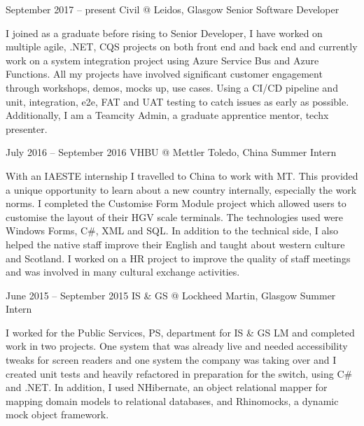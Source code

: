 \documentclass{tccv}
\begin{document}
\begin{eventlist}


\item{September 2017 -- present}
     {Civil @ Leidos, Glasgow}
     {Senior Software Developer}

I joined as a graduate before rising to Senior Developer, I have worked on multiple agile, .NET, CQS projects on both front end and back end and currently work on a system integration project using Azure Service Bus and Azure Functions. All my projects have involved significant customer engagement through workshops, demos, mocks up, use cases. Using a CI/CD pipeline and unit, integration, e2e, FAT and UAT testing to catch issues as early as possible. Additionally, I am a Teamcity Admin, a graduate apprentice mentor, techx presenter. 


\item{July 2016 -- September 2016}
     {VHBU @ Mettler Toledo, China}
     {Summer Intern}

With an IAESTE internship I travelled to China to work with MT. This provided a unique opportunity to learn about a new country internally, especially the work norms. I completed the Customise Form Module project which allowed users to customise the layout of their HGV scale terminals. The technologies used were Windows Forms, C\#, XML and SQL. In addition to the technical side, I also helped the native staff improve their English and taught about western culture and Scotland. I worked on a HR project to improve the quality of staff meetings and was involved in many cultural exchange activities.

\item{June 2015 -- September 2015}
     {IS \& GS @ Lockheed Martin, Glasgow}
     {Summer Intern}

I worked for the Public Services, PS, department for IS \& GS LM and completed work in two projects. One system that was already live and needed accessibility tweaks for screen readers and one system the company was taking over and I created unit tests and heavily refactored in preparation for the switch, using C\# and .NET. In addition, I used NHibernate, an object relational mapper for mapping domain models to relational databases, and Rhinomocks, a dynamic mock object framework.

     



\end{eventlist}

\end{document}
